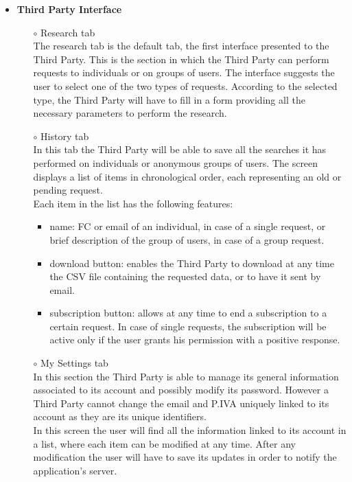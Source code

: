 \documentclass[titlepage]{article}
\begin{document}
\begin{itemize}
\begin{itemize}
				\item{\bf Third Party Interface}
				\begin{itemize}
					\item[$\circ$] Research tab \\
				The research tab is the default tab, the first interface presented to the Third Party. This is the section in which the Third Party can perform requests to individuals or on groups of users. The interface suggests the user to select one of the two types of requests. According to the selected type, the Third Party will have to fill in a form providing all the necessary parameters to perform the research.
					\item[$\circ$] History tab\\
				In this tab the Third Party will be able to save all the searches it has performed on individuals or anonymous groups of users. The screen displays a list of items in chronological order, each representing an old or pending request.\\
Each item in the list has the following features:
						\begin{itemize}
							\item name: FC or email of an individual, in case of a single request, or brief description of the group of users, in case of a group request.
							\item download button: enables the Third Party to download at any time the CSV file containing the requested data, or to have it sent by email.
							\item subscription button: allows at any time to end a subscription to a certain request. In case of single requests, the subscription will be active only if the user grants his permission with a positive response.
						\end{itemize}
						

					\item[$\circ$] My Settings tab \\
				In this section the Third Party is able to manage its general information associated to its account and possibly modify its password. However a Third Party cannot change the email and P.IVA uniquely linked to its account as they are its unique identifiers.\\
In this screen the user will find all the information linked to its account in a list, where each item can be modified at any time. After any modification the user will have to save its updates in order to notify the application’s server.


\end{itemize}
\end{itemize}
\end{itemize}
\end{document}
